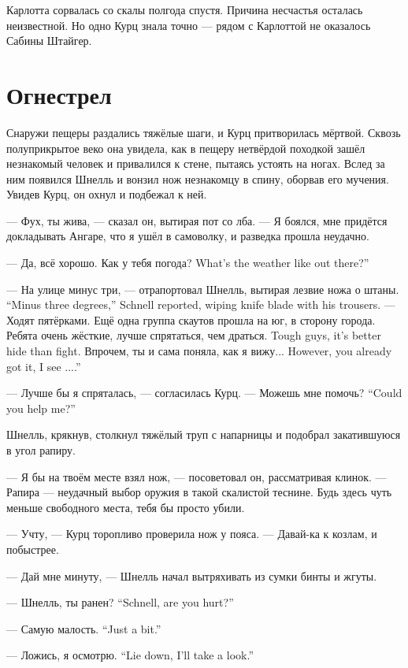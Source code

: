 Карлотта сорвалась со скалы полгода спустя.
Причина несчастья осталась неизвестной.
Но одно Курц знала точно --- рядом с Карлоттой не оказалось Сабины Штайгер.

\section{Огнестрел}

Снаружи пещеры раздались тяжёлые шаги, и Курц притворилась мёртвой.
Сквозь полуприкрытое веко она увидела, как в пещеру нетвёрдой походкой зашёл незнакомый человек и привалился к стене, пытаясь устоять на ногах.
Вслед за ним появился Шнелль и вонзил нож незнакомцу в спину, оборвав его мучения.
Увидев Курц, он охнул и подбежал к ней.

--- Фух, ты жива, --- сказал он, вытирая пот со лба.
--- Я боялся, мне придётся докладывать Ангаре, что я ушёл в самоволку, и разведка прошла неудачно.

--- Да, всё хорошо.
{Как у тебя погода?}
{What's the weather like out there?''}

{--- На улице минус три, --- отрапортовал Шнелль, вытирая лезвие ножа о штаны.}
{``Minus three degrees,'' Schnell reported, wiping knife blade with his trousers.}
--- Ходят пятёрками.
Ещё одна группа скаутов прошла на юг, в сторону города.
{Ребята очень жёсткие, лучше спрятаться, чем драться.}
{Tough guys, it's better hide than fight.}
{Впрочем, ты и сама поняла, как я вижу...}
{However, you already got it, I see ....''}

--- Лучше бы я спряталась, --- согласилась Курц.
{--- Можешь мне помочь?}
{``Could you help me?''}

Шнелль, крякнув, столкнул тяжёлый труп с напарницы и подобрал закатившуюся в угол рапиру.

--- Я бы на твоём месте взял нож, --- посоветовал он, рассматривая клинок.
--- Рапира --- неудачный выбор оружия в такой скалистой теснине.
Будь здесь чуть меньше свободного места, тебя бы просто убили.

--- Учту, --- Курц торопливо проверила нож у пояса.
--- Давай-ка к козлам, и побыстрее.

--- Дай мне минуту, --- Шнелль начал вытряхивать из сумки бинты и жгуты.

{--- Шнелль, ты ранен?}
{``Schnell, are you hurt?''}

{--- Самую малость.}
{``Just a bit.''}

{--- Ложись, я осмотрю.}
{``Lie down, I'll take a look.''}

